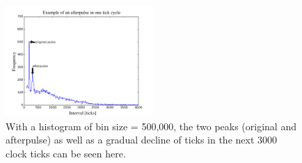 \documentclass[authoryear, 12pt,5p, times]{elsarticle}
\begin{document}
\begin{figure}[h]
\centering
\includegraphics[width=0.5\textwidth]{figures/afterpulse}
\caption{With a histogram of bin size = 500,000, the two peaks (original and afterpulse) as well as a gradual decline of ticks in the next 3000 clock ticks can be seen here.}
\label{afterpulse}
\end{figure}
\end{document}
